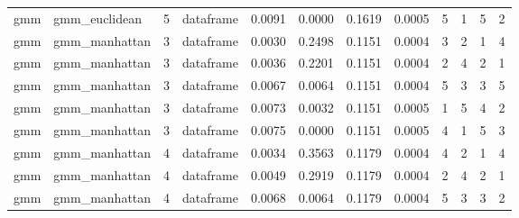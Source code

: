 {\begin{longtable}{| p{1cm} | p{1.8cm} | p{0.7cm} | p{0.9cm} | p{0.5cm} | p{0.65cm} | p{0.5cm} | p{0.5cm} | p{0.55cm} | p{0.55cm} | p{0.6cm} | p{0.5cm} |}
\scriptsize     gmm   & \scriptsize    gmm\_euclidean & \scriptsize    5    & \scriptsize dataframe & \scriptsize    0.0091  &  \scriptsize 0.0000 & \scriptsize 0.1619 & \scriptsize    0.0005 & \scriptsize   5  & \scriptsize    1  & \scriptsize    5  & \scriptsize    2 \\
\cline{2-12}
\scriptsize     gmm   & \scriptsize    gmm\_manhattan & \scriptsize    3    & \scriptsize dataframe & \scriptsize    0.0030  &  \scriptsize 0.2498 & \scriptsize 0.1151 & \scriptsize    0.0004 & \scriptsize   3  & \scriptsize    2  & \scriptsize    1  & \scriptsize    4 \\
\scriptsize     gmm   & \scriptsize    gmm\_manhattan & \scriptsize    3    & \scriptsize dataframe & \scriptsize    0.0036  &  \scriptsize 0.2201 & \scriptsize 0.1151 & \scriptsize    0.0004 & \scriptsize   2  & \scriptsize    4  & \scriptsize    2  & \scriptsize    1 \\
\scriptsize     gmm   & \scriptsize    gmm\_manhattan & \scriptsize    3    & \scriptsize dataframe & \scriptsize    0.0067  &  \scriptsize 0.0064 & \scriptsize 0.1151 & \scriptsize    0.0004 & \scriptsize   5  & \scriptsize    3  & \scriptsize    3  & \scriptsize    5 \\
\scriptsize     gmm   & \scriptsize    gmm\_manhattan & \scriptsize    3    & \scriptsize dataframe & \scriptsize    0.0073  &  \scriptsize 0.0032 & \scriptsize 0.1151 & \scriptsize    0.0005 & \scriptsize   1  & \scriptsize    5  & \scriptsize    4  & \scriptsize    2 \\
\scriptsize     gmm   & \scriptsize    gmm\_manhattan & \scriptsize    3    & \scriptsize dataframe & \scriptsize    0.0075  &  \scriptsize 0.0000 & \scriptsize 0.1151 & \scriptsize    0.0005 & \scriptsize   4  & \scriptsize    1  & \scriptsize    5  & \scriptsize    3 \\
\cline{3-12}
\scriptsize     gmm   & \scriptsize    gmm\_manhattan & \scriptsize    4    & \scriptsize dataframe & \scriptsize    0.0034  &  \scriptsize 0.3563 & \scriptsize 0.1179 & \scriptsize    0.0004 & \scriptsize   4  & \scriptsize    2  & \scriptsize    1  & \scriptsize    4 \\
\scriptsize     gmm   & \scriptsize    gmm\_manhattan & \scriptsize    4    & \scriptsize dataframe & \scriptsize    0.0049  &  \scriptsize 0.2919 & \scriptsize 0.1179 & \scriptsize    0.0004 & \scriptsize   2  & \scriptsize    4  & \scriptsize    2  & \scriptsize    1 \\
\scriptsize     gmm   & \scriptsize    gmm\_manhattan & \scriptsize    4    & \scriptsize dataframe & \scriptsize    0.0068  &  \scriptsize 0.0064 & \scriptsize 0.1179 & \scriptsize    0.0004 & \scriptsize   5  & \scriptsize    3  & \scriptsize    3  & \scriptsize    2 \\

\end{longtable}}
